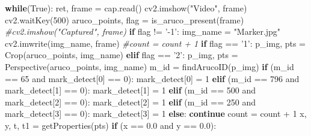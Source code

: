 \documentclass[]{article}
\newenvironment{Shaded}{}{}
\newcommand{\DecValTok}[1]{\textcolor[rgb]{0.25,0.63,0.44}{{#1}}}
\newcommand{\FloatTok}[1]{\textcolor[rgb]{0.25,0.63,0.44}{{#1}}}
\newcommand{\StringTok}[1]{\textcolor[rgb]{0.25,0.44,0.63}{{#1}}}
\newcommand{\CommentTok}[1]{\textcolor[rgb]{0.38,0.63,0.69}{\textit{{#1}}}}
\newcommand{\VariableTok}[1]{\textcolor[rgb]{0.10,0.09,0.49}{{#1}}}
\newcommand{\ControlFlowTok}[1]{\textcolor[rgb]{0.00,0.44,0.13}{\textbf{{#1}}}}
\newcommand{\OperatorTok}[1]{\textcolor[rgb]{0.40,0.40,0.40}{{#1}}}
\newcommand{\NormalTok}[1]{{#1}}
\begin{document}
\begin{Shaded}
\begin{Highlighting}[]
    \ControlFlowTok{while}\NormalTok{(}\VariableTok{True}\NormalTok{):}
        \NormalTok{ret, frame }\OperatorTok{=} \NormalTok{cap.read()}
        \NormalTok{cv2.imshow(}\StringTok{"Video"}\NormalTok{, frame)}
        \NormalTok{cv2.waitKey(}\DecValTok{500}\NormalTok{)}
        \NormalTok{aruco_points, flag }\OperatorTok{=} \NormalTok{is_aruco_present(frame)}
        \CommentTok{#cv2.imshow("Captured", frame)}
        \ControlFlowTok{if} \NormalTok{flag }\OperatorTok{!=} \StringTok{'-1'}\NormalTok{:}
            \NormalTok{img_name }\OperatorTok{=} \StringTok{"Marker.jpg"}
            \NormalTok{cv2.imwrite(img_name, frame)}
            \CommentTok{#count = count + 1}
            \ControlFlowTok{if} \NormalTok{flag }\OperatorTok{==} \StringTok{'1'}\NormalTok{:}
                \NormalTok{p_img, pts }\OperatorTok{=} \NormalTok{Crop(aruco_points, img_name)}
            \ControlFlowTok{elif} \NormalTok{flag }\OperatorTok{==} \StringTok{'2'}\NormalTok{:}
                \NormalTok{p_img, pts }\OperatorTok{=} \NormalTok{Perspective(aruco_points, img_name)}
            \NormalTok{m_id }\OperatorTok{=} \NormalTok{findArucoID(p_img)}
            \ControlFlowTok{if} \NormalTok{(m_id }\OperatorTok{==} \DecValTok{65} \OperatorTok{and} \NormalTok{mark_detect[}\DecValTok{0}\NormalTok{] }\OperatorTok{==} \DecValTok{0}\NormalTok{):}
                \NormalTok{mark_detect[}\DecValTok{0}\NormalTok{] }\OperatorTok{=} \DecValTok{1}
            \ControlFlowTok{elif} \NormalTok{(m_id }\OperatorTok{==} \DecValTok{796} \OperatorTok{and} \NormalTok{mark_detect[}\DecValTok{1}\NormalTok{] }\OperatorTok{==} \DecValTok{0}\NormalTok{):}
                \NormalTok{mark_detect[}\DecValTok{1}\NormalTok{] }\OperatorTok{=} \DecValTok{1}
            \ControlFlowTok{elif} \NormalTok{(m_id }\OperatorTok{==} \DecValTok{500} \OperatorTok{and} \NormalTok{mark_detect[}\DecValTok{2}\NormalTok{] }\OperatorTok{==} \DecValTok{0}\NormalTok{):}
                \NormalTok{mark_detect[}\DecValTok{2}\NormalTok{] }\OperatorTok{=} \DecValTok{1}
            \ControlFlowTok{elif} \NormalTok{(m_id }\OperatorTok{==} \DecValTok{250} \OperatorTok{and} \NormalTok{mark_detect[}\DecValTok{3}\NormalTok{] }\OperatorTok{==} \DecValTok{0}\NormalTok{):}
                \NormalTok{mark_detect[}\DecValTok{3}\NormalTok{] }\OperatorTok{=} \DecValTok{1}
            \ControlFlowTok{else}\NormalTok{:}
                \ControlFlowTok{continue}
            \NormalTok{count }\OperatorTok{=} \NormalTok{count }\OperatorTok{+} \DecValTok{1}
            \NormalTok{x, y, t, t1 }\OperatorTok{=} \NormalTok{getProperties(pts)}
            \ControlFlowTok{if} \NormalTok{(x }\OperatorTok{==} \FloatTok{0.0} \OperatorTok{and} \NormalTok{y }\OperatorTok{==} \FloatTok{0.0}\NormalTok{):}

\end{Highlighting}
\end{Shaded}
\end{document}
